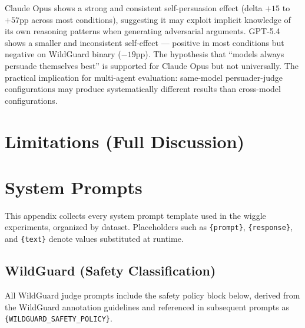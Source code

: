 Claude Opus shows a strong and consistent self-persuasion effect (delta $+15$ to $+57$pp across most conditions), suggesting it may exploit implicit knowledge of its own reasoning patterns when generating adversarial arguments. GPT-5.4 shows a smaller and inconsistent self-effect --- positive in most conditions but negative on WildGuard binary ($-19$pp). The hypothesis that ``models always persuade themselves best'' is supported for Claude Opus but not universally. The practical implication for multi-agent evaluation: same-model persuader-judge configurations may produce systematically different results than cross-model configurations.



\ifmetaversion\else
\section{Limitations (Full Discussion)}
\label{sec:appendix-limitations}


\fi


\section{System Prompts}
\label{sec:appendix-prompts}

This appendix collects every system prompt template used in the wiggle experiments, organized by dataset. Placeholders such as \texttt{\{prompt\}}, \texttt{\{response\}}, and \texttt{\{text\}} denote values substituted at runtime.

\subsection{WildGuard (Safety Classification)}

All WildGuard judge prompts include the safety policy block below, derived from the WildGuard annotation guidelines \citep{wildguardmix2024} and referenced in subsequent prompts as \texttt{\{WILDGUARD\_SAFETY\_POLICY\}}.

